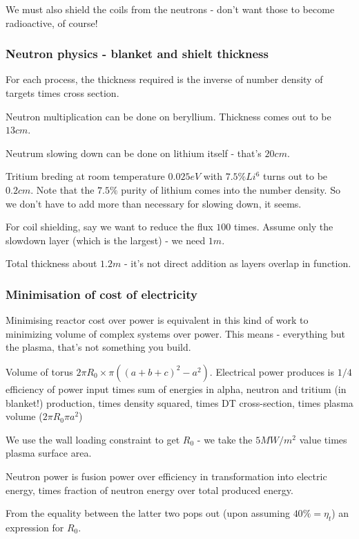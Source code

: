 \documentclass[PlasmaNotes.tex]{subfiles}
\begin{document}
We must also shield the coils from the neutrons - don't want those to become radioactive, of course!

\subsubsection{Neutron physics - blanket and shielt thickness}

For each process, the thickness required is the inverse of number density of targets times cross section.

Neutron multiplication can be done on beryllium. Thickness comes out to be $13 cm$.

Neutrum slowing down can be done on lithium itself - that's $20 cm$.

Tritium breding at room temperature $0.025 eV$ with $7.5\% Li^6$ turns out to be $0.2 cm$. Note that the $7.5\%$ purity of lithium comes into the number density. So we don't have to add more than necessary for slowing down, it seems.

For coil shielding, say we want to reduce the flux $100$ times. Assume only the slowdown layer (which is the largest) - we need $1m$.

Total thickness about $1.2m$ - it's not direct addition as layers overlap in function.

\subsubsection{Minimisation of cost of electricity}

Minimising reactor cost over power is equivalent in this kind of work to minimizing volume of complex systems over power. This means - everything but the plasma, that's not something you build.

Volume of torus $2 \pi R_0 \times \pi ((a+b+c)^2-a^2)$. Electrical power produces is $1/4$ efficiency of power input times sum of energies in alpha, neutron and tritium (in blanket!) production, times density squared, times DT cross-section, times plasma volume ($2\pi R_0 \pi a^2$)

We use the wall loading constraint to get $R_0$ - we take the $5 MW/m^2$ value times plasma surface area.

Neutron power is fusion power over efficiency in transformation into electric energy, times fraction of neutron energy over total produced energy.

From the equality between the latter two pops out (upon assuming $40\% = \eta_t$) an expression for $R_0$.
\end{document}
